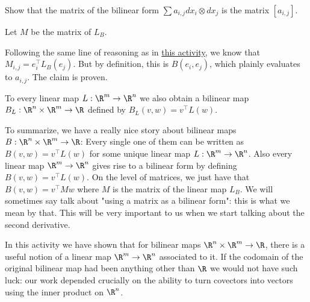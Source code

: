 \documentclass{ximera}
\begin{document}
	Show that the matrix of the bilinear form $\sum a_{i,j} dx_i \otimes dx_j$ is the matrix $[a_{i,j}]$.
	
	\begin{free-response}
		Let $M$ be the matrix of $L_B$.
		
		Following the same line of reasoning as in \href{http://ximera.osu.edu/course/kisonecat/m2o2c2/course/activity/week1/inner-product/multiply-dot/}{this activity}, we 
		know that $M_{i,j} = e_i^\top L_B(e_j)$.  But by definition, this is 	$B(e_i,e_j)$, which plainly evaluates to $a_{i,j}$.   The claim is proven.
	\end{free-response}
	
	To every linear map  $L:\R^m \to \R^n$ we also obtain a bilinear map $B_L : \R^n \times \R^m \to \R$ defined by $B_L(v,w) = v^\top L(w)$.
	
	To summarize, we have a really nice story about bilinear maps $B:\R^n \times \R^m \to \R$:  Every single one of them can be written as $B(v,w) = v^\top L(w)$ for some 
	unique linear map $L:\R^m \to \R^n$. Also every linear map $\R^m \to \R^n$ gives rise to a bilinear form by defining $B(v,w) = v^\top L(w)$.  On the level of matrices,
	we just have that $B(v,w) = v^\top M w $ where $M$ is the matrix of the linear map $L_B$.  We will sometimes say talk about "using a matrix as a bilinear form":  this is what we
	mean by that.  This will be very important to us when we start talking about the second derivative.
	
	In this activity we have shown that for bilinear maps $\R^n \times \R^m \to \R$, there is a useful notion of a linear map $\R^m \to \R^n$ associated to it.  
	If the codomain of the original bilinear map had been anything other than $\R$ we would not have such luck: our work depended crucially on
	the ability to turn covectors into vectors using the inner product on $\R^n$.
	
	
\end{document}
